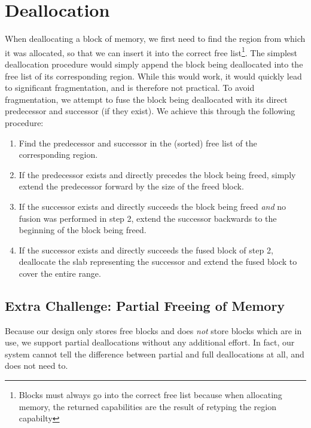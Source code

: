 \section{Deallocation}
When deallocating a block of memory, we first need to find the region from which it was allocated, so that we can insert it into the correct free list\footnote{Blocks must always go into the correct free list because when allocating memory, the returned capabilities are the result of retyping the region capabilty}.
The simplest deallocation procedure would simply append the block being deallocated into the free list of its corresponding region. While this would work, it would quickly lead to significant fragmentation, and is therefore not practical.
To avoid fragmentation, we attempt to fuse the block being deallocated with its direct predecessor and successor (if they exist). We achieve this through the following procedure:
\begin{enumerate}
    \item Find the predecessor and successor in the (sorted) free list of the corresponding region.
    \item If the predecessor exists and directly precedes the block being freed, simply extend the predecessor forward by the size of the freed block.
    \item If the successor exists and directly succeeds the block being freed \textit{and} no fusion was performed in step 2, extend the successor backwards to the beginning of the block being freed.
    \item If the successor exists and directly succeeds the fused block of step 2, deallocate the slab representing the successor and extend the fused block to cover the entire range.
\end{enumerate}

\subsection{Extra Challenge: Partial Freeing of Memory}
Because our design only stores free blocks and does \textit{not} store blocks which are in use, we support partial deallocations without any additional effort. In fact, our system cannot tell the difference between partial and full deallocations at all, and does not need to.

